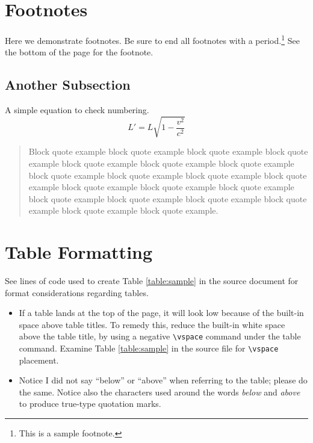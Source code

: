\section{Footnotes}
Here we demonstrate footnotes. Be sure to end all footnotes with a period.\footnote{This is a sample footnote.} See the bottom of the page for the footnote.


\subsection{Another Subsection}
A simple equation to check numbering.
\begin{equation}
    L' = {L}{\sqrt{1-\frac{v^2}{c^2}}}
\end{equation}
\lipsum[3] %
\begin{quote}
    Block quote example block quote example block quote example block quote example block quote example block quote example block quote example block quote example block quote example block quote example block quote example block quote example block quote example block quote example block quote example block quote example block quote example block quote example block quote example block quote example.\cite{katz_2007}  
\end{quote}
\lipsum[2] %


\section{Table Formatting}\label{section:tableformat}
See lines of code used to create Table \ref{table:sample} in the source document for format considerations regarding tables. 
\begin{itemize}
    \item If a table lands at the top of the page, it will look low because of the built-in space above table titles. To remedy this, reduce the built-in white space above the table title, by using a negative \verb+\vspace+ command under the table command. Examine Table \ref{table:sample} in the source file for \verb+\vspace+ placement.
    \item Notice I did not say ``below'' or ``above'' when referring to the table; please do the same. Notice also the characters used around the words \emph{below} and \emph{above} to produce true-type quotation marks.
\end{itemize}
     
